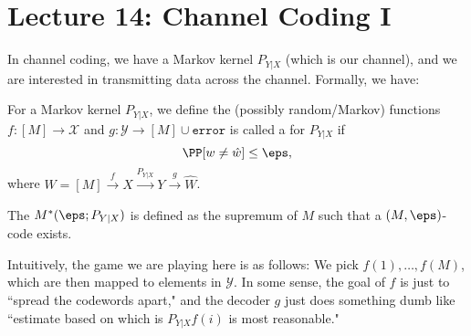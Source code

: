 \section*{Lecture 14: Channel Coding I}
\setcounter{section}{14}

In channel coding, we have a Markov kernel $P_{Y|X}$ (which is our channel), and we are interested in transmitting data across the channel.
Formally, we have: 

\begin{defn}
	For a Markov kernel $P_{Y|X}$, we define the (possibly random/Markov) functions $f\colon [M]\to \mathcal X$ and $g\colon \mathcal Y\to [M] \cup \texttt{error}$ is called a  for $P_{Y|X}$ if \[
		\PP[w\neq \hat w] \leq \eps,
	\]
	where $W = [M] \stackrel{f}{\longrightarrow} X \stackrel{P_{Y|X}}{\longrightarrow} Y \stackrel{g}{\longrightarrow} \hat W$.
\end{defn}

\begin{defn}
	The  $M^*(\eps; P_{Y|X})$ is defined as the supremum of $M$ such that a $(M,\eps)$-code exists.
\end{defn}

Intuitively, the game we are playing here is as follows: We pick  $f(1), \ldots, f(M)$, which are then mapped to elements in $\mathcal Y$. In some sense, the goal of $f$ is just to ``spread the codewords apart," and the decoder $g$ just does something dumb like ``estimate based on which is $P_{Y|X} f(i)$ is most reasonable."

